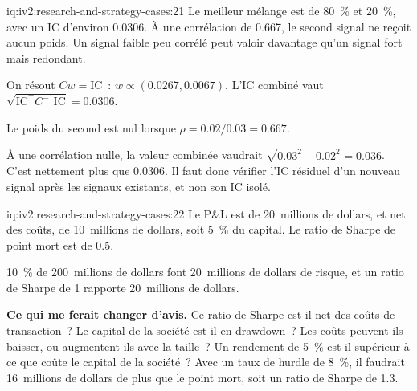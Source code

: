 \begin{solution}{iq:iv2:research-and-strategy-cases:21}
Le meilleur mélange est de 80~\% et 20~\%, avec un IC d'environ 0.0306. À une corrélation de 0.667, le second signal ne reçoit aucun poids. Un signal faible peu corrélé peut valoir davantage qu'un signal fort mais redondant.

On résout $Cw = \mathrm{IC}$~: $w \propto (0.0267, 0.0067)$. L'IC combiné vaut $\sqrt{\mathrm{IC}^\top C^{-1}\mathrm{IC}} = 0.0306$.

Le poids du second est nul lorsque $\rho = 0.02/0.03 = 0.667$.

À une corrélation nulle, la valeur combinée vaudrait $\sqrt{0.03^2 + 0.02^2} = 0.036$. C'est nettement plus que 0.0306. Il faut donc vérifier l'IC résiduel d'un nouveau signal après les signaux existants, et non son IC isolé.

\end{solution}

\begin{solution}{iq:iv2:research-and-strategy-cases:22}
Le P\&L est de 20~millions de dollars, et net des coûts, de 10~millions de dollars, soit 5~\% du capital. Le ratio de Sharpe de point mort est de 0.5.

10~\% de 200~millions de dollars font 20~millions de dollars de risque, et un ratio de Sharpe de 1 rapporte 20~millions de dollars.

\textbf{Ce qui me ferait changer d'avis.} Ce ratio de Sharpe est-il net des coûts de transaction~? Le capital de la société est-il en drawdown~? Les coûts peuvent-ils baisser, ou augmentent-ils avec la taille~? Un rendement de 5~\% est-il supérieur à ce que coûte le capital de la société~? Avec un taux de hurdle de 8~\%, il faudrait 16~millions de dollars de plus que le point mort, soit un ratio de Sharpe de 1.3.

\end{solution}

